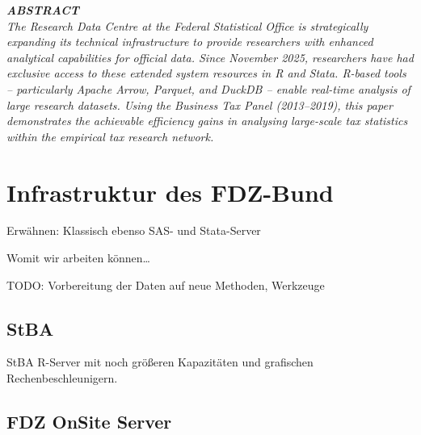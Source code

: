 \documentclass[
  german,
  10pt,
  twoside]{article}
\renewcommand*\contentsname{Inhaltsverzeichnis}
\newcommand\contentsname{Inhaltsverzeichnis}
\begin{document}
\begin{titlepage}
\begin{minipage}[t]{11.8cm}
\vspace{0.3cm}

{\itshape\color{wistaDarkGray}\bfseries\MakeUppercase{Abstract}}\\[0.15cm]
\small\itshape
The Research Data Centre at the Federal Statistical Office is strategically expanding its technical infrastructure to provide researchers with enhanced analytical capabilities for official data. Since November 2025, researchers have had exclusive access to these extended system resources in R and Stata. R-based tools -- particularly Apache Arrow, Parquet, and DuckDB -- enable real-time analysis of large research datasets. Using the Business Tax Panel (2013--2019), this paper demonstrates the achievable efficiency gains in analysing large-scale tax statistics within the empirical tax research network.

\end{minipage}

\vfill

\vspace{0.5cm}
\noindent{}

\end{titlepage}

\pagestyle{fancy}

\renewcommand*\contentsname{Inhaltsverzeichnis}
{
\hypersetup{linkcolor=}
\setcounter{tocdepth}{3}
\tableofcontents
}

\section{Infrastruktur des FDZ-Bund}\label{sec-infrastruktur}

Erwähnen: Klassisch ebenso SAS- und Stata-Server

Womit wir arbeiten können\ldots{}

TODO: Vorbereitung der Daten auf neue Methoden, Werkzeuge

\subsection{StBA}\label{stba}

StBA R-Server mit noch größeren Kapazitäten und grafischen
Rechenbeschleunigern.

\subsection{FDZ OnSite Server}\label{fdz-onsite-server}
\end{document}
